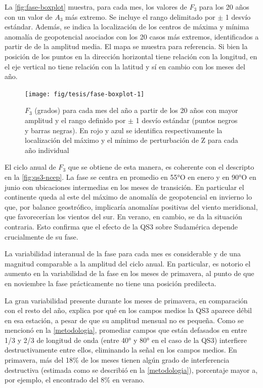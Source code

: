 \documentclass[spanish,a4paper,12pt,oneside]{book}
\begin{document}
La \autoref{fig:fase-boxplot} muestra, para cada mes, los valores de
\(F_3\) para los 20 años con un valor de \(A_3\) más extremo. Se incluye
el rango delimitado por \(\pm\) 1 desvío estándar. Además, se indica la
localización de los centros de máxima y mínima anomalía de geopotencial
asociados con los 20 casos más extremos, identificados a partir de de la
amplitud media. El mapa se muestra para referencia. Si bien la posición
de los puntos en la dirección horizontal tiene relación con la longitud,
en el eje vertical no tiene relación con la latitud y sí en cambio con
los meses del año.

\begin{landscape}\begin{figure}

{\centering \texttt{[image: fig/tesis/fase-boxplot-1]} 

}

\caption{$F_3$ (grados) para cada mes del año a partir de los 20 años con mayor amplitud y el rango definido por $\pm$ 1 desvío estándar  (puntos negros y barras negras). En rojo y azul se identifica respectivamente la localización del máximo y el mínimo de perturbación de Z para cada año individual}\label{fig:fase-boxplot}
\end{figure}
\end{landscape}

El ciclo anual de \(F_3\) que se obtiene de esta manera, es coherente
con el descripto en la \autoref{fig:qs3-ncep}. La fase se centra en
promedio en 55°O en enero y en 90°O en junio con ubicaciones intermedias
en los meses de transición. En particular el continente queda al este
del máximo de anomalía de geopotencial en invierno lo que, por balance
geostrófico, implicaría anomalías positivas del viento meridional, que
favorecerían los vientos del sur. En verano, en cambio, se da la
situación contraria. Esto confirma que el efecto de la QS3 sobre
Sudamérica depende crucialmente de su fase.

La variabilidad interanual de la fase para cada mes es considerable y de
una magnitud comparable a la amplitud del ciclo anual. En particular, es
notorio el aumento en la variabilidad de la fase en los meses de
primavera, al punto de que en noviembre la fase prácticamente no tiene
una posición predilecta.

La gran variabilidad presente durante los meses de primavera, en
comparación con el resto del año, explica por qué en los campos medios
la QS3 aparece débil en esa estación, a pesar de que su amplitud mensual
no es pequeña. Como se mencionó en la \autoref{metodologia}, promediar
campos que están defasados en entre 1/3 y 2/3 de longitud de onda (entre
40° y 80° en el caso de la QS3) interfiere destructivamente entre ellos,
eliminando la señal en los campos medios. En primavera, más del 18\% de
los meses tienen algún grado de interferencia destructiva (estimada como
se describió en la \autoref{metodologia}), porcentaje mayor a, por
ejemplo, el encontrado del 8\% en verano.
\end{document}

